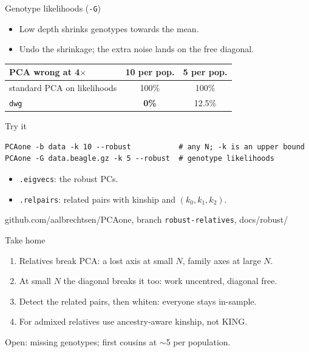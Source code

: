 \documentclass[11pt,aspectratio=169]{beamer}
\newcommand{\aside}[1]{{\scriptsize\color{muted}#1}}
\begin{document}
\begin{frame}{Genotype likelihoods (\texttt{-G})}
\begin{itemize}
  \item Low depth shrinks genotypes towards the mean.
  \item Undo the shrinkage; the extra noise lands on the free diagonal.
\end{itemize}
\vspace{6pt}
\centering
\begin{tabular}{@{}lcc@{}}
\toprule
PCA wrong at 4$\times$ & 10 per pop. & 5 per pop. \\
\midrule
standard PCA on likelihoods & 100\% & 100\% \\
\texttt{dwg} & \textbf{0\%} & 12.5\% \\
\bottomrule
\end{tabular}
\end{frame}

\begin{frame}[fragile]{Try it}
\begin{verbatim}
PCAone -b data -k 10 --robust           # any N; -k is an upper bound
PCAone -G data.beagle.gz -k 5 --robust  # genotype likelihoods
\end{verbatim}
\vspace{6pt}
\begin{itemize}
  \item \texttt{.eigvecs}: the robust PCs.
  \item \texttt{.relpairs}: related pairs with kinship and $(k_0,k_1,k_2)$.
\end{itemize}
\vspace{6pt}
\aside{github.com/aalbrechtsen/PCAone, branch \texttt{robust-relatives}, docs/robust/}
\end{frame}

\begin{frame}{Take home}
\begin{enumerate}
  \item Relatives break PCA: a lost axis at small $N$, family axes at large $N$.
  \item At small $N$ the diagonal breaks it too: work uncentred, diagonal free.
  \item Detect the related pairs, then whiten: everyone stays in-sample.
  \item For admixed relatives use ancestry-aware kinship, not KING.
\end{enumerate}
\vspace{8pt}
\aside{Open: missing genotypes; first cousins at $\sim$5 per population.}
\end{frame}
\end{document}
